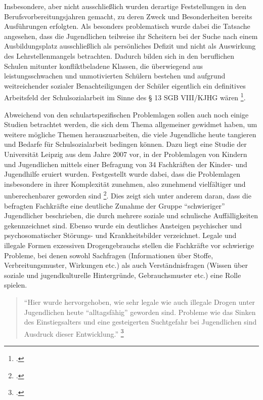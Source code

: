 Insbesondere, aber nicht ausschließlich wurden derartige Feststellungen in den Berufsvorbereitungsjahren gemacht, zu deren Zweck und Besonderheiten bereits Ausführungen erfolgten. Als besonders problematisch wurde dabei die Tatsache angesehen, dass die Jugendlichen teilweise ihr Scheitern bei der Suche nach einem Ausbildungsplatz ausschließlich als persönliches Defizit und nicht als Auswirkung des Lehrstellenmangels betrachten. Dadurch bilden sich in den beruflichen Schulen mitunter konfliktbeladene Klassen, die überwiegend aus leistungsschwachen und unmotivierten Schülern bestehen und aufgrund weitreichender sozialer Benachteiligungen der Schüler eigentlich ein definitives Arbeitsfeld der Schulsozialarbeit im Sinne des § 13 SGB VIII/KJHG wären \footcite[18]{LSS2004}.

Abweichend von den schulartspezifischen Problemlagen sollen auch noch einige Studien betrachtet werden, die sich dem Thema allgemeiner gewidmet haben, um weitere mögliche Themen herauszuarbeiten, die viele Jugendliche heute tangieren und Bedarfe für Schulsozialarbeit bedingen können. Dazu liegt eine Studie der Universität Leipzig aus dem Jahre 2007 vor, in der Problemlagen von Kindern und Jugendlichen mittels einer Befragung von 34 Fachkräften der Kinder- und Jugendhilfe eruiert wurden. Festgestellt wurde dabei, dass die Problemlagen insbesondere in ihrer Komplexität zunehmen, also zunehmend vielfältiger und unberechenbarer geworden sind \footcite[vgl.][142ff]{UniversitaetLeipzig2007}. Dies zeigt sich unter anderem daran, dass die befragten Fachkräfte eine deutliche Zunahme der Gruppe "`schwieriger"' Jugendlicher beschrieben, die durch mehrere soziale und schulische Auffälligkeiten gekennzeichnet sind. Ebenso wurde ein deutliches Ansteigen psychischer und psychosomatischer Störungs- und Krankheitsbilder verzeichnet. Legale und illegale Formen exzessiven Drogengebrauchs stellen die Fachkräfte vor schwierige Probleme, bei denen sowohl Sachfragen (Informationen über Stoffe, Verbreitungsmuster, Wirkungen etc.) als auch Verständnisfragen (Wissen über soziale und jugendkulturelle Hintergründe, Gebrauchsmuster etc.) eine Rolle spielen. 

\begin{quotation}
\noindent
"`Hier wurde hervorgehoben, wie sehr legale wie auch illegale Drogen unter Jugendlichen heute "`alltagsfähig"' geworden sind. Probleme wie das Sinken des Einstiegsalters und eine gesteigerten Suchtgefahr bei Jugendlichen sind Ausdruck dieser Entwicklung."' \footcite[vgl.][142ff]{UniversitaetLeipzig2007}
\end{quotation}

